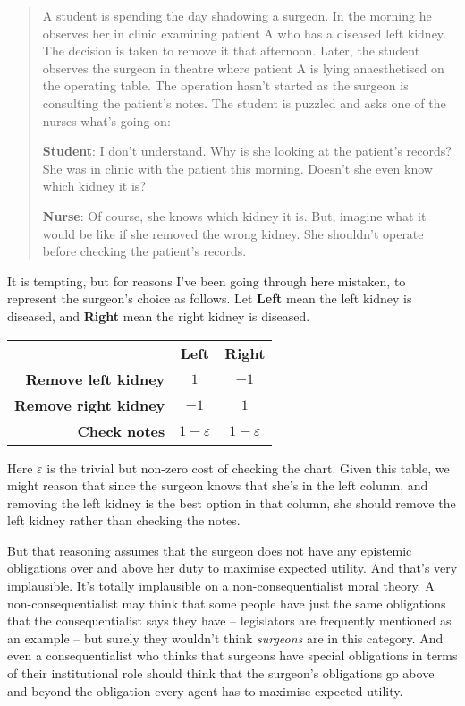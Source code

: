 \begin{quote}
A student is spending the day shadowing a surgeon. In the morning he observes her in clinic examining patient A who has a diseased left kidney. The decision is taken to remove it that afternoon. Later, the student observes the surgeon in theatre where patient A is lying anaesthetised on the operating table. The operation hasn't started as the surgeon is consulting the patient's notes. The student is puzzled and asks one of the nurses what's going on: 

\textbf{Student}: I don't understand. Why is she looking at the patient's records? She was in clinic with the patient this morning. Doesn't she even know which kidney it is? 

\textbf{Nurse}: Of course, she knows which kidney it is. But, imagine what it would be like if she removed the wrong kidney. She shouldn't operate before checking the patient's records. \citep[1144-1145]{Brown2008-BROKAP}
\end{quote}

\noindent It is tempting, but for reasons I've been going through here mistaken, to represent the surgeon's choice as follows. Let \textbf{Left} mean the left kidney is diseased, and \textbf{Right} mean the right kidney is diseased.

\begin{center}
\begin{tabular}{r c c}
 & \textbf{Left} & \textbf{Right} \\
\textbf{Remove left kidney} & $1$ & $-1$ \\
\textbf{Remove right kidney} & $-1$ & $1$ \\
\textbf{Check notes} & $1-\varepsilon$ & $1-\varepsilon$ \\
\end{tabular}
\end{center}

\noindent Here $\varepsilon$ is the trivial but non-zero cost of checking the chart. Given this table, we might reason that since the surgeon knows that she's in the left column, and removing the left kidney is the best option in that column, she should remove the left kidney rather than checking the notes.

But that reasoning assumes that the surgeon does not have any epistemic obligations over and above her duty to maximise expected utility. And that's very implausible. It's totally implausible on a non-consequentialist moral theory. A non-consequentialist may think that some people have just the same obligations that the consequentialist says they have -- legislators are frequently mentioned as an example -- but surely they wouldn't think \textit{surgeons} are in this category. And even a consequentialist who thinks that surgeons have special obligations in terms of their institutional role should think that the surgeon's obligations go above and beyond the obligation every agent has to maximise expected utility.

